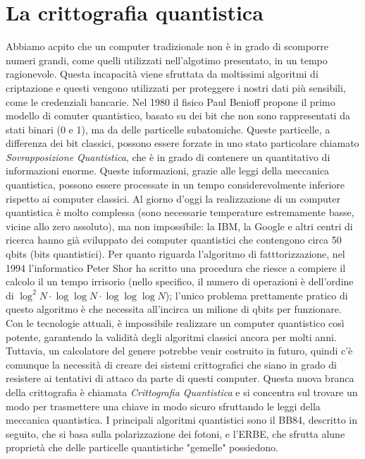 \documentclass[italian,A4,12pt]{article}
\begin{document}
  \section{La crittografia quantistica}
    Abbiamo acpito che un computer tradizionale non è in grado di scomporre numeri grandi, come quelli utilizzati nell'algotimo presentato, in un tempo ragionevole. Questa incapacità viene sfruttata da moltissimi algoritmi di criptazione e questi vengono utilizzati per proteggere i nostri dati più sensibili, come le credenziali bancarie.
    Nel 1980 il fisico Paul Benioff propone il primo modello di comuter quantistico, basato su dei bit che non sono rappresentati da stati binari (0 e 1), ma da delle particelle subatomiche.
    Queste particelle, a differenza dei bit classici, possono essere forzate in uno stato particolare chiamato \textit{Sovrapposizione Quantistica}, che è in grado di contenere un quantitativo di informazioni enorme.
    Queste informazioni, grazie alle leggi della meccanica quantistica, possono essere processate in un tempo considerevolmente inferiore rispetto ai computer classici.
    Al giorno d'oggi la realizzazione di un computer quantistica è molto complessa (sono necessarie temperature estremamente basse, vicine allo zero assoluto), ma non impossibile: la IBM, la Google e altri centri di ricerca hanno già sviluppato dei computer quantistici che contengono circa 50 qbits (bits quantistici).
    Per quanto riguarda l'algoritmo di fatttorizzazione, nel 1994 l'informatico Peter Shor ha scritto una procedura che riesce a compiere il calcolo il un tempo irrisorio (nello specifico, il numero di operazioni è dell'ordine di $\log^2{N}\cdot\log{\log{N}}\cdot\log{\log{\log{N}}}$); l'unico problema prettamente pratico di questo algoritmo è che necessita all'incirca un milione di qbits per funzionare.
    Con le tecnologie attuali, è impossibile realizzare un computer quantistico così potente, garantendo la validità degli algoritmi classici ancora per molti anni. Tuttavia, un calcolatore del genere potrebbe venir costruito in futuro, quindi c'è comunque la necessità di creare dei sistemi crittografici che siano in grado di resistere ai tentativi di attaco da parte di questi computer.
    Questa nuova branca della crittografia è chiamata \textit{Crittografia Quantistica} e si concentra sul trovare un modo per trasmettere una chiave in modo sicuro sfruttando le leggi della meccanica quantistica.
    I principali algoritmi quantistici sono il BB84, descritto in seguito, che si basa sulla polarizzazione dei fotoni, e l'ERBE, che sfrutta alune proprietà che delle particelle quantistiche "gemelle" possiedono.
\end{document}
